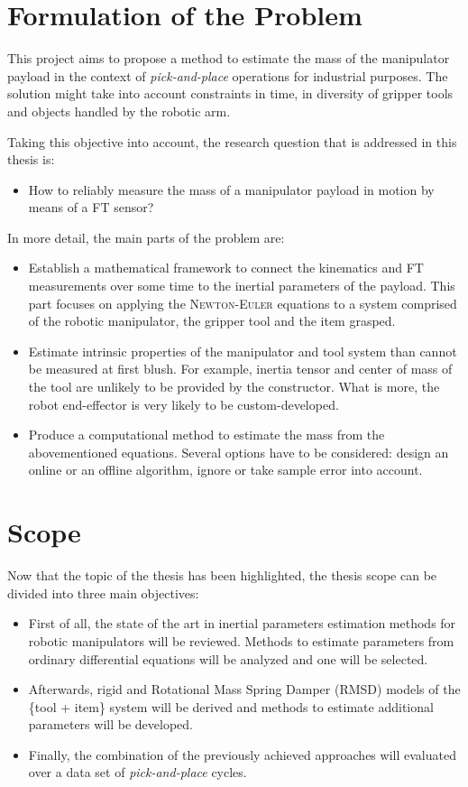 \documentclass[/home/francois/latex/report/main.tex]{subfiles}
\begin{document}
\section{Formulation of the Problem}

This project aims to propose a method to estimate the mass of the manipulator payload in the context of \textit{pick-and-place} operations for industrial purposes. The solution might take into account constraints in time, in diversity of gripper tools and objects handled by the robotic arm.

Taking this objective into account, the research question that is addressed in this thesis is:

\begin{itemize}
 \item[] How to reliably measure the mass of a manipulator payload in motion by means of a \ac{FT} sensor?
\end{itemize}

In more detail, the main parts of the problem are:

\begin{itemize}
 \item Establish a mathematical framework to connect the kinematics and \ac{FT} measurements over some time to the inertial parameters of the payload. This part focuses on applying the \textsc{Newton-Euler} equations to a system comprised of the robotic manipulator, the gripper tool and the item grasped.
 \item Estimate intrinsic properties of the manipulator and tool system than cannot be measured at first blush. For example, inertia tensor and center of mass of the tool are unlikely to be provided by the constructor. What is more, the robot end-effector is very likely to be custom-developed.
 \item Produce a computational method to estimate the mass from the abovementioned equations. Several options have to be considered: design an online or an offline algorithm, ignore or take sample error into account.
\end{itemize}

\section{Scope}

Now that the topic of the thesis has been highlighted, the thesis scope can be divided into three main objectives:

\begin{itemize}
    \item First of all, the state of the art in inertial parameters estimation methods for robotic manipulators will be reviewed. Methods to estimate parameters from ordinary differential equations will be analyzed and one will be selected.
    \item Afterwards, rigid and Rotational Mass Spring Damper (RMSD) models of the \{tool + item\} system will be derived and methods to estimate additional parameters will be developed.
    \item Finally, the combination of the previously achieved approaches will evaluated over a data set of \textit{pick-and-place} cycles.
\end{itemize}
\end{document}
